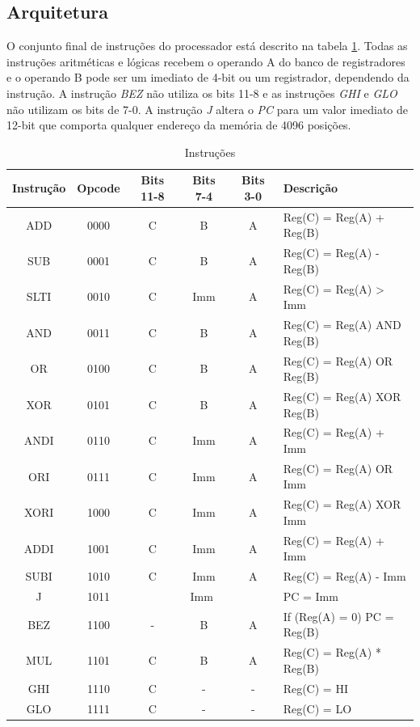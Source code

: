 \documentclass[11pt,a4paper,titlepage]{article}
\begin{document}
\subsection{Arquitetura}

O conjunto final de instruções do processador está descrito na tabela \ref{tab:instructions}. Todas as instruções aritméticas e lógicas recebem o operando A do banco de registradores e o operando B pode ser um imediato de 4-bit ou um registrador, dependendo da instrução. A instrução \textit{BEZ} não utiliza os bits 11-8 e as instruções \textit{GHI} e \textit{GLO} não utilizam os bits de 7-0. A instrução \textit{J} altera o \textit{PC} para um valor imediato de 12-bit que comporta qualquer endereço da memória de 4096 posições.

\begin{table}[!h]
\centering
\begin{tabular}{| c | c | c | c | c | l |}
\hline
Instrução & Opcode & Bits 11-8 & Bits 7-4 & Bits 3-0 & Descrição \\
\hline
 ADD  & 0000 & C & B & A   & Reg(C) = Reg(A) + Reg(B) \\
\hline
 SUB  & 0001 & C & B & A   & Reg(C) = Reg(A) - Reg(B) \\
\hline
 SLTI & 0010 & C & Imm & A & Reg(C) = Reg(A) > Imm \\
\hline
 AND  & 0011 & C & B & A   & Reg(C) = Reg(A) AND Reg(B) \\
\hline
 OR   & 0100 & C & B & A   & Reg(C) = Reg(A) OR Reg(B) \\
\hline
 XOR  & 0101 & C & B & A   & Reg(C) = Reg(A) XOR Reg(B) \\
\hline
 ANDI & 0110 & C & Imm & A & Reg(C) = Reg(A) + Imm \\
\hline
 ORI  & 0111 & C & Imm & A & Reg(C) = Reg(A) OR Imm \\
\hline
 XORI & 1000 & C & Imm & A & Reg(C) = Reg(A) XOR Imm \\
\hline
 ADDI & 1001 & C & Imm & A & Reg(C) = Reg(A) + Imm \\
\hline
 SUBI & 1010 & C & Imm & A & Reg(C) = Reg(A) - Imm \\
\hline
 J    & 1011 & \multicolumn{3}{c|}{Imm} & PC = Imm \\
\hline
 BEZ  & 1100 & - & B & A   & If (Reg(A) = 0) PC = Reg(B) \\
\hline
 MUL  & 1101 & C & B & A   & Reg(C) = Reg(A) * Reg(B) \\
\hline
 GHI  & 1110 & C & - & -   & Reg(C) = HI \\
\hline
 GLO  & 1111 & C & - & -   & Reg(C) = LO \\
\hline
\end{tabular}
\caption{Instruções}
\label{tab:instructions}
\end{table}
%
\end{document}
